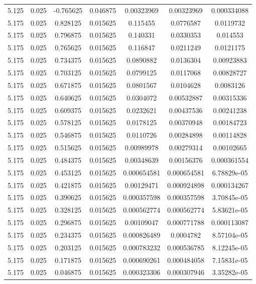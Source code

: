 \begin{flushleft}
\begin{longtable}{ccccccc}
5.125 & 0.025 & -0.765625 & 0.046875 & 0.00323969 & 0.00323969 & 0.000334088  \\ 
5.175 & 0.025 & 0.828125 & 0.015625 & 0.115455 & 0.0776587 & 0.0119732  \\ 
5.175 & 0.025 & 0.796875 & 0.015625 & 0.140331 & 0.0330353 & 0.014553  \\ 
5.175 & 0.025 & 0.765625 & 0.015625 & 0.116847 & 0.0211249 & 0.0121175  \\ 
5.175 & 0.025 & 0.734375 & 0.015625 & 0.0890882 & 0.0136304 & 0.00923883  \\ 
5.175 & 0.025 & 0.703125 & 0.015625 & 0.0799125 & 0.0117068 & 0.00828727  \\ 
5.175 & 0.025 & 0.671875 & 0.015625 & 0.0801567 & 0.0104628 & 0.0083126  \\ 
5.175 & 0.025 & 0.640625 & 0.015625 & 0.0304072 & 0.00532887 & 0.00315336  \\ 
5.175 & 0.025 & 0.609375 & 0.015625 & 0.0232621 & 0.00437536 & 0.00241238  \\ 
5.175 & 0.025 & 0.578125 & 0.015625 & 0.0178125 & 0.00370948 & 0.00184723  \\ 
5.175 & 0.025 & 0.546875 & 0.015625 & 0.0110726 & 0.00284898 & 0.00114828  \\ 
5.175 & 0.025 & 0.515625 & 0.015625 & 0.00989978 & 0.00279314 & 0.00102665  \\ 
5.175 & 0.025 & 0.484375 & 0.015625 & 0.00348639 & 0.00156376 & 0.000361554  \\ 
5.175 & 0.025 & 0.453125 & 0.015625 & 0.000654581 & 0.000654581 & 6.78829e-05  \\ 
5.175 & 0.025 & 0.421875 & 0.015625 & 0.00129471 & 0.000924898 & 0.000134267  \\ 
5.175 & 0.025 & 0.390625 & 0.015625 & 0.000357598 & 0.000357598 & 3.70845e-05  \\ 
5.175 & 0.025 & 0.328125 & 0.015625 & 0.000562774 & 0.000562774 & 5.83621e-05  \\ 
5.175 & 0.025 & 0.296875 & 0.015625 & 0.00109047 & 0.000771788 & 0.000113087  \\ 
5.175 & 0.025 & 0.234375 & 0.015625 & 0.000826489 & 0.0004782 & 8.57104e-05  \\ 
5.175 & 0.025 & 0.203125 & 0.015625 & 0.000783232 & 0.000536785 & 8.12245e-05  \\ 
5.175 & 0.025 & 0.171875 & 0.015625 & 0.000690261 & 0.000484058 & 7.15831e-05  \\ 
5.175 & 0.025 & 0.046875 & 0.015625 & 0.000323306 & 0.000307946 & 3.35282e-05  \\ 

\end{longtable}
\end{flushleft}
